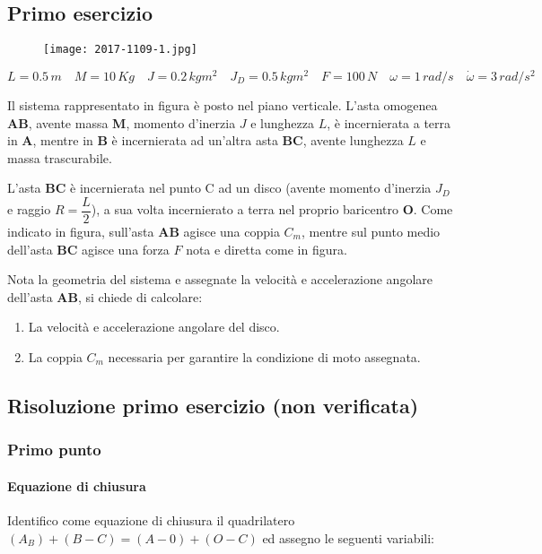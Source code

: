 \documentclass[main.tex]{subfiles}
\begin{document}
\subsection{Primo esercizio}

\begin{figure}[H]
\centering
\texttt{[image: 2017-1109-1.jpg]}
\end{figure}

\[
	L = 0.5\,m\quad
	M = 10\,Kg\quad
	J = 0.2\,kgm^2\quad
	J_D = 0.5\,kgm^2\quad
	F = 100\,N\quad
	\omega = 1\,rad/s\quad
	\dot{\omega} = 3\,rad/s^2
\]

Il sistema rappresentato in figura è posto nel piano verticale. L'asta omogenea \textbf{AB}, avente massa \textbf{M}, momento d'inerzia $J$ e lunghezza $L$, è incernierata a terra in \textbf{A}, mentre in \textbf{B} è incernierata ad un'altra asta \textbf{BC}, avente lunghezza $L$ e massa trascurabile.

L'asta \textbf{BC} è incernierata nel punto C ad un disco (avente momento d'inerzia $J_D$ e raggio $R = \dfrac{L}{2}$), a sua volta incernierato a terra nel proprio baricentro \textbf{O}. Come indicato in figura, sull'asta \textbf{AB} agisce una coppia $C_m$, mentre sul punto medio dell'asta \textbf{BC} agisce una forza $F$ nota e diretta come in figura.

Nota la geometria del sistema e assegnate la velocità e accelerazione angolare dell'asta \textbf{AB}, si chiede di calcolare:
\begin{enumerate}
\item La velocità e accelerazione angolare del disco.
\item La coppia $C_m$ necessaria per garantire la condizione di moto assegnata.
\end{enumerate}

\clearpage

\subsection{Risoluzione primo esercizio (non verificata)}

\subsubsection{Primo punto}

\paragraph{Equazione di chiusura}
Identifico come equazione di chiusura il quadrilatero $(A_B) + (B-C) = (A-0) + (O-C)$ ed assegno le seguenti variabili:
\end{document}
